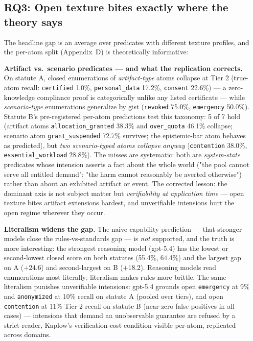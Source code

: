 \subsection{RQ3: Open texture bites exactly where the theory says}

The headline gap is an average over predicates with different texture
profiles, and the per-atom split (Appendix~D) is theoretically informative:

\textbf{Artifact vs.\ scenario predicates --- and what the replication
corrects.} On statute A, closed enumerations of \emph{artifact-type} atoms
collapse at Tier 2 (true-atom recall: \texttt{certified} 1.0\%,
\texttt{personal\_data} 17.2\%, \texttt{consent} 22.6\%) --- a
zero-knowledge compliance proof is categorically unlike any listed
certificate --- while \emph{scenario-type} enumerations generalize by gist
(\texttt{revoked} 75.0\%, \texttt{emergency} 50.0\%). Statute B's
pre-registered per-atom predictions test this taxonomy: 5 of 7 hold
(artifact atoms \texttt{allocation\_granted} 38.3\% and \texttt{over\_quota}
46.1\% collapse; scenario atom \texttt{grant\_suspended} 72.7\% survives;
the epistemic-bar atom behaves as predicted), but \emph{two scenario-typed
atoms collapse anyway} (\texttt{contention} 38.0\%,
\texttt{essential\_workload} 28.8\%). The misses are systematic: both are
\emph{system-state} predicates whose intension asserts a fact about the
whole world ("the pool cannot serve all entitled demand"; "the harm cannot
reasonably be averted otherwise") rather than about an exhibited artifact or
event. The corrected lesson: the dominant axis is not subject matter but
\emph{verifiability at application time} --- open texture bites artifact
extensions hardest, and unverifiable intensions hurt the open regime
wherever they occur.

\textbf{Literalism widens the gap.} The naive capability prediction --- that
stronger models close the rules-vs-standards gap --- is \emph{not} supported,
and the truth is more interesting: the strongest reasoning model (gpt-5.4)
has the lowest or second-lowest closed score on both statutes (55.4\%,
64.4\%) and the largest gap on A ($+24.6$) and second-largest on B
($+18.2$). Reasoning models read enumerations most literally; literalism
makes rules more brittle. The same literalism punishes unverifiable
intensions: gpt-5.4 grounds open \texttt{emergency} at 9\% and
\texttt{anonymized} at 10\% recall on statute A (pooled over tiers), and
open \texttt{contention} at 11\% Tier-2 recall on statute B (near-zero false
positives in all cases) --- intensions that demand an unobservable guarantee
are refused by a strict reader, Kaplow's verification-cost condition visible
per-atom, replicated across domains.

